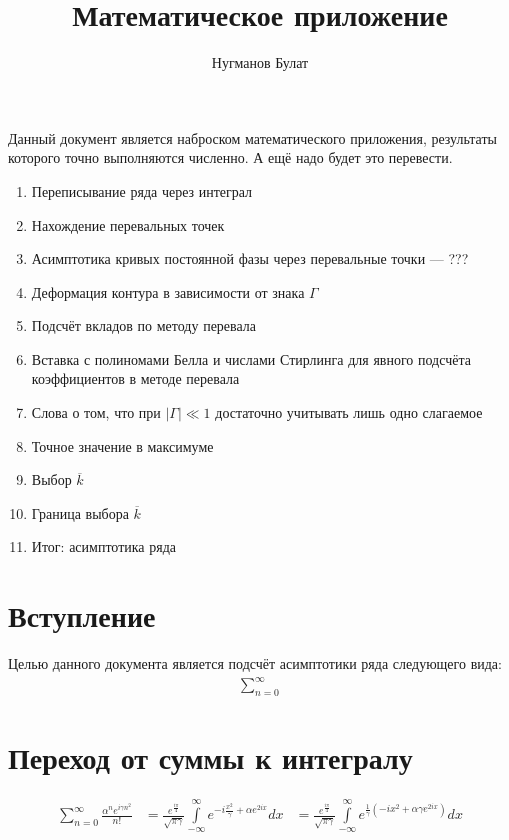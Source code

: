 \documentclass[a4paper, 12pt]{article}
\author{Нугманов Булат}
\title{Математическое приложение}
\newenvironment{eqw}{\begin{equation} \begin{aligned}}   
    {\end{aligned}    \end{equation}}
\begin{document}
\maketitle
Данный документ является наброском математического приложения, результаты которого точно выполняются численно. А ещё надо будет это перевести.

\begin{enumerate}
    \item Переписывание ряда через интеграл
    \item Нахождение перевальных точек
    \item Асимптотика кривых постоянной фазы через перевальные точки --- ???
    \item Деформация контура в зависимости от знака $\Gamma$
    \item Подсчёт вкладов по методу перевала
    \item Вставка с полиномами Белла и числами Стирлинга для явного подсчёта коэффициентов в методе перевала
    \item Слова о том, что при $|\Gamma| \ll 1$ достаточно учитывать лишь одно слагаемое
    \item Точное значение в максимуме
    \item Выбор $\overline{k}$
    \item Граница выбора $\overline{k}$
    \item Итог: асимптотика ряда
\end{enumerate}
\section*{Вступление}
Целью данного документа является подсчёт асимптотики ряда следующего вида:
\begin{eqw}
    \sum\limits_{n=0}^\infty
\end{eqw}

\section*{Переход от суммы к интегралу}



\begin{eqw}
    \sum\limits_{n=0}^{\infty} \frac{\alpha^n e^{i\gamma n^2}}{n!} 
    &= \frac{e^{\frac{i\pi}{4}}}{\sqrt{\pi\gamma}}
    \int\limits_{-\infty}^{\infty}e^{-i \frac{x^2}{\gamma} + \alpha e^{2ix}}dx
    &= \frac{e^{\frac{i\pi}{4}}}{\sqrt{\pi\gamma}}
    \int\limits_{-\infty}^{\infty}e^{\frac{1}{\gamma}\left(-i x^2 + \alpha \gamma e^{2ix}\right)}dx
\end{eqw}
\end{document}

